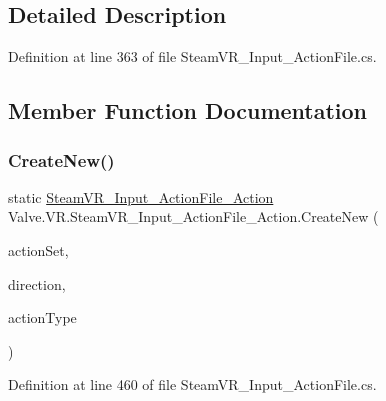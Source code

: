 \subsection{Detailed Description}


Definition at line 363 of file Steam\+V\+R\+\_\+\+Input\+\_\+\+Action\+File.\+cs.



\subsection{Member Function Documentation}
\mbox{\label{class_valve_1_1_v_r_1_1_steam_v_r___input___action_file___action_a6f8110f6855b3f2e0ee12fb8fe9bde34}} 
\subsubsection{\texorpdfstring{CreateNew()}{CreateNew()}}
{\footnotesize\ttfamily static \mbox{\hyperlink{class_valve_1_1_v_r_1_1_steam_v_r___input___action_file___action}{Steam\+V\+R\+\_\+\+Input\+\_\+\+Action\+File\+\_\+\+Action}} Valve.\+V\+R.\+Steam\+V\+R\+\_\+\+Input\+\_\+\+Action\+File\+\_\+\+Action.\+Create\+New (\begin{DoxyParamCaption}\item[{string}]{action\+Set,  }\item[{\mbox{\hyperlink{namespace_valve_1_1_v_r_a1e6192cb5ddaf204afab87ccb5728780}{Steam\+V\+R\+\_\+\+Action\+Directions}}}]{direction,  }\item[{string}]{action\+Type }\end{DoxyParamCaption})\hspace{0.3cm}{\ttfamily [static]}}



Definition at line 460 of file Steam\+V\+R\+\_\+\+Input\+\_\+\+Action\+File.\+cs.

\mbox{\label{class_valve_1_1_v_r_1_1_steam_v_r___input___action_file___action_ac8aa08124febad10a50b8bd6900809bb}} 
